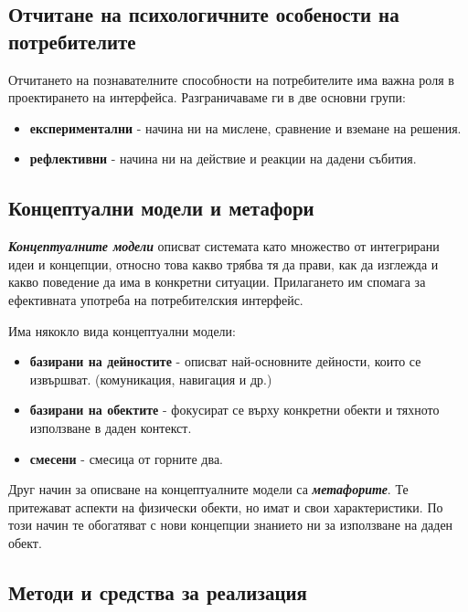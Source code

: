 \documentclass[fleqn,12pt]{article}
\begin{document}
\subsection{Отчитане на психологичните особености на потребителите}

Отчитането на познавателните способности на потребителите има важна роля в проектирането на интерфейса.
Разграничаваме ги в две основни групи: %
\begin{itemize}
    \item \textbf{експериментални} -  начина ни на мислене, сравнение и вземане на решения.
    \item \textbf{рефлективни} - начина ни на действие и реакции на дадени събития.
\end{itemize}

\subsection{Концептуални модели и метафори}

\textbf{\textit{Концептуалните модели}} описват системата като множество от интегрирани идеи и концепции, относно това какво трябва тя да прави, как да изглежда и какво поведение да има в конкретни ситуации.
Прилагането им спомага за ефективната употреба на потребителския интерфейс.
\bigbreak

Има някокло вида концептуални модели:
\begin{itemize}
    \item \textbf{базирани на дейностите} - описват най-основните дейности, които се извършват. (комуникация, навигация и др.)
    \item \textbf{базирани на обектите} - фокусират се върху конкретни обекти и тяхното използване в даден контекст.
    \item \textbf{смесени} - смесица от горните два.
\end{itemize}

Друг начин за описване на концептуалните модели са \textbf{\textit{метафорите}}.
Те притежават аспекти на физически обекти, но имат и свои характеристики.
По този начин те обогатяват с нови концепции знанието ни за използване на даден обект.

\subsection{Методи и средства за реализация}
\end{document}
